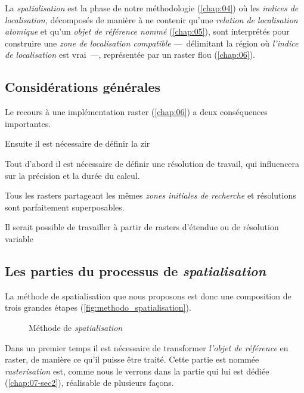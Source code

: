 La \emph{spatialisation} est la phase de notre méthodologie (\autoref{chap:04}) où les \emph{indices de localisation,} décomposés de manière à ne contenir qu'une \emph{relation de localisation atomique} et qu'un \emph{objet de référence nommé} (\autoref{chap:05}), sont interprétés pour construire une \emph{zone de localisation compatible} ---~délimitant la région où \emph{l'indice de localisation} est vrai~---, représentée par un raster flou (\autoref{chap:06}).

\subsection{Considérations générales}

Le recours à une implémentation raster (\autoref{chap:06}) a deux conséquences importantes. 

Ensuite il est nécessaire de définir la \ac{zir}

Tout d'abord il est nécessaire de définir une résolution de travail, qui influencera sur la précision et la durée du calcul.

Tous les rasters partageant les mêmes \emph{zones initiales de recherche} et résolutions sont parfaitement superposables.

%
Il serait possible de travailler à partir de rasters d'étendue ou de résolution variable

\subsection{Les parties du processus de \emph{spatialisation}}


La méthode de spatialisation que nous proposons est donc une composition de trois grandes étapes (\autoref{fig:methodo_spatialisation}).


\begin{figure}
  \centering
  
  \caption{Méthode de \emph{spatialisation}}
  \label{fig:methodo_spatialisation}
\end{figure}

%
Dans un premier temps il est nécessaire de transformer \emph{l'objet de référence} en raster, de manière ce qu'il puisse être traité. Cette partie est nommée \emph{rasterisation} est, comme nous le verrons dans la partie qui lui est dédiée (\autoref{chap:07-sec2}), réalisable de plusieurs façons.

